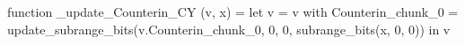 function _update_Counterin_CY (v, x) = let v = { v with Counterin_chunk_0 = update_subrange_bits(v.Counterin_chunk_0, 0, 0, subrange_bits(x, 0, 0)) } in
  v
